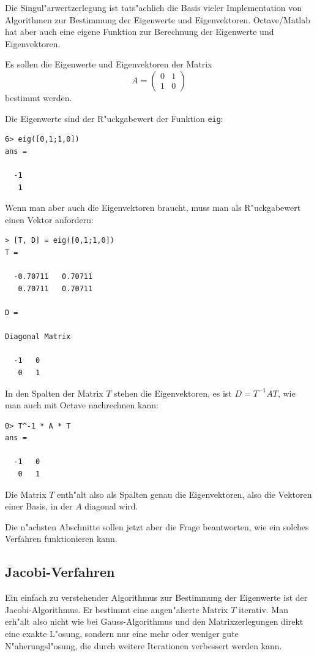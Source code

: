 Die Singul"arwertzerlegung ist tats"achlich die Basis vieler Implementation
von Algorithmen zur Bestimmung der Eigenwerte und Eigenvektoren. 
Octave/Matlab hat aber auch eine eigene Funktion zur Berechnung der
Eigenwerte und Eigenvektoren.
\begin{beispiel}
Es sollen die Eigenwerte und Eigenvektoren der Matrix
\[
A=\begin{pmatrix}0&1\\1&0\end{pmatrix}
\]
bestimmt werden.

Die Eigenwerte sind der R"uckgabewert der Funktion {\tt eig}:
\begin{verbatim}
6> eig([0,1;1,0])
ans =

  -1
   1
\end{verbatim}
Wenn man aber auch die Eigenvektoren braucht, muss man als R"uckgabewert
einen Vektor anfordern:
\begin{verbatim}
> [T, D] = eig([0,1;1,0])
T =

  -0.70711   0.70711
   0.70711   0.70711

D =

Diagonal Matrix

  -1   0
   0   1
\end{verbatim}
In den Spalten der Matrix $T$ stehen die Eigenvektoren, es ist
$D=T^{-1}AT$, wie man auch mit Octave nachrechnen kann:
\begin{verbatim}
0> T^-1 * A * T
ans =

  -1   0
   0   1
\end{verbatim}
Die Matrix $T$ enth"alt also als Spalten genau die Eigenvektoren,
also die Vektoren einer Basis, in der $A$ diagonal wird.
\end{beispiel}
Die n"achsten Abschnitte sollen jetzt aber die Frage beantworten,
wie ein solches Verfahren funktionieren kann.

\subsection{Jacobi-Verfahren}
Ein einfach zu verstehender Algorithmus zur Bestimmung der Eigenwerte
ist der Jacobi-Algorithmus. Er bestimmt eine angen"aherte Matrix
$T$ iterativ. Man erh"alt also nicht wie bei Gauss-Algorithmus und
den Matrixzerlegungen direkt eine exakte L"osung, sondern nur eine
mehr oder weniger gute N"aherungsl"osung, die durch weitere Iterationen
verbessert werden kann.


